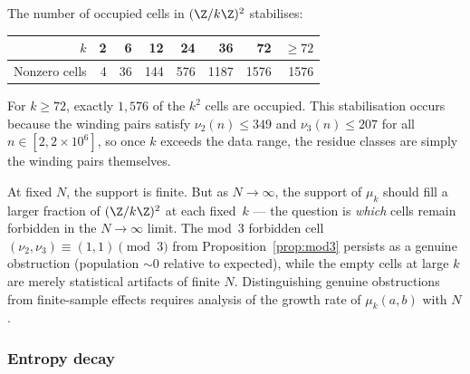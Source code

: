 \begin{empirical}
\label{obs:support-stab}
    The number of occupied cells in $(\Z/k\Z)^2$ stabilises:
    \begin{center}
    \renewcommand{\arraystretch}{1.15}
    \begin{tabular}{rrrrrrrr}
        \toprule
        $k$ & 2 & 6 & 12 & 24 & 36 & 72 & $\geq 72$ \\
        \midrule
        Nonzero cells & 4 & 36 & 144 & 576 & 1187 & 1576 & 1576 \\
        \bottomrule
    \end{tabular}
    \end{center}
    For $k \geq 72$, exactly $1{,}576$ of the $k^2$ cells are occupied.
    This stabilisation occurs because the winding pairs satisfy
    $\nu_2(n) \leq 349$ and $\nu_3(n) \leq 207$ for all
    $n \in [2, 2 \times 10^6]$, so once $k$ exceeds the data range,
    the residue classes are simply the winding pairs themselves.
\end{empirical}

\begin{remark}
    At fixed $N$, the support is finite.  But as $N \to \infty$, the
    support of $\mu_k$ should fill a larger fraction of
    $(\Z/k\Z)^2$ at each fixed~$k$ --- the question is \emph{which}
    cells remain forbidden in the $N \to \infty$ limit.  The mod~$3$
    forbidden cell $(\nu_2, \nu_3) \equiv (1, 1) \pmod{3}$ from
    Proposition~\ref{prop:mod3} persists as a genuine obstruction
    (population $\sim 0$ relative to expected), while the empty cells
    at large $k$ are merely statistical artifacts of finite $N$.
    Distinguishing genuine obstructions from finite-sample effects
    requires analysis of the growth rate of $\mu_k(a,b)$ with $N$.
\end{remark}


\subsubsection{Entropy decay}

